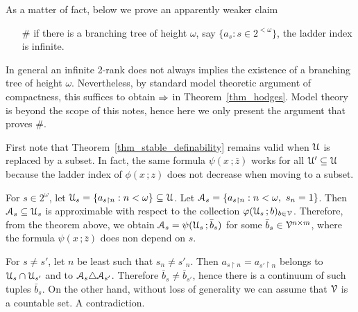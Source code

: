 \documentclass[scombinatorics.tex]{subfiles}
\begin{document}
As a matter of fact, below we prove an apparently weaker claim
\begin{itemize}
  \item[\#] if there is a branching tree of height $\omega$, say $\{a_s:s\in2^{<\omega}\}$, the ladder index is infinite.
\end{itemize}
In general an infinite 2-rank does not always implies the existence of a branching tree of height $\omega$.
Nevertheless, by standard model theoretic argument of compactness, this suffices to obtain $\Rightarrow$ in Theorem~\ref{thm_hodges}.
Model theory is beyond the scope of this notes, hence here we only present the argument that proves \#.

First note that Theorem~\ref{thm_stable_definability} remains valid when $\EuScript U$ is replaced by a subset.
In fact, the same formula $\psi(x\,;\bar z)$ works for all $\EuScript U'\subseteq\EuScript U$ because the ladder index of $\phi(x\,;z)$ does not decrease when moving to a subset.

For $s\in2^\omega$, let $\EuScript U_s=\{a_{s\restriction n}:n<\omega\}\subseteq\EuScript U$.
Let $\Aa_s=\{a_{s\restriction n}:n<\omega,\ s_n=1\}$.
Then $\EuScript A_s\subseteq\EuScript U_s$ is approximable with respect to the collection $\varphi(\EuScript U_s\,;b)_{b\in\EuScript V}$.
Therefore, from the theorem above, we obtain $\EuScript A_s=\psi(\EuScript U_s\,;\bar b_s)$ for some  $\bar b_s\in\EuScript V^{n\times m}$, where the formula $\psi(x\,;\bar z)$ does non depend on $s$.

For $s\neq s'$, let $n$ be least such that $s_n\neq s'_n$.
Then $a_{s\restriction n}=a_{s'\restriction n}$ belongs to $\EuScript U_s\cap\EuScript U_{s'}$ and to $\EuScript A_s\triangle\EuScript A_{s'}$.
Therefore $\bar b_s\neq\bar b_{s'}$, hence there is a continuum of such tuples $\bar b_s$.
On the other hand, without loss of generality we can assume that $\EuScript V$ is a countable set. 
A contradiction. 


\end{document}
